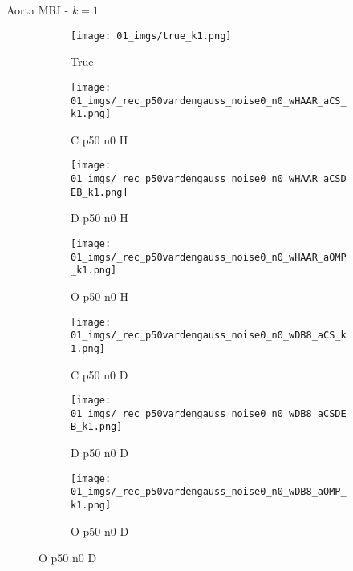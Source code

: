 \begin{frame}{Aorta MRI - $k=1$}{}
\begin{figure}
\begin{subfigure}{0.13\textwidth}
\texttt{[image: 01\_imgs/true\_k1.png]}
\caption*{\tiny True}
\end{subfigure}
\begin{subfigure}{0.13\textwidth}
\texttt{[image: 01\_imgs/\_rec\_p50vardengauss\_noise0\_n0\_wHAAR\_aCS\_k1.png]}
\caption*{\tiny C p50 n0 H}
\end{subfigure}
\begin{subfigure}{0.13\textwidth}
\texttt{[image: 01\_imgs/\_rec\_p50vardengauss\_noise0\_n0\_wHAAR\_aCSDEB\_k1.png]}
\caption*{\tiny D p50 n0 H}
\end{subfigure}
\begin{subfigure}{0.13\textwidth}
\texttt{[image: 01\_imgs/\_rec\_p50vardengauss\_noise0\_n0\_wHAAR\_aOMP\_k1.png]}
\caption*{\tiny O p50 n0 H}
\end{subfigure}
\begin{subfigure}{0.13\textwidth}
\texttt{[image: 01\_imgs/\_rec\_p50vardengauss\_noise0\_n0\_wDB8\_aCS\_k1.png]}
\caption*{\tiny C p50 n0 D}
\end{subfigure}
\begin{subfigure}{0.13\textwidth}
\texttt{[image: 01\_imgs/\_rec\_p50vardengauss\_noise0\_n0\_wDB8\_aCSDEB\_k1.png]}
\caption*{\tiny D p50 n0 D}
\end{subfigure}
\begin{subfigure}{0.13\textwidth}
\texttt{[image: 01\_imgs/\_rec\_p50vardengauss\_noise0\_n0\_wDB8\_aOMP\_k1.png]}
\caption*{\tiny O p50 n0 D}
\end{subfigure}

\vspace{5pt}


\end{figure}
\end{frame}

